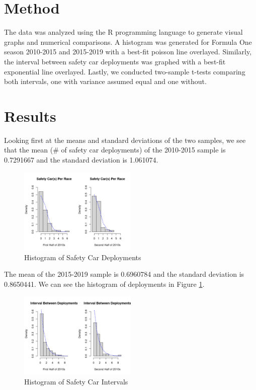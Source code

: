 \documentclass[11pt]{article}
\begin{document}
\section{Method}
The data was analyzed using the R programming language to generate visual graphs and numerical comparisons. A histogram was generated for Formula One season 2010-2015 and 2015-2019 with a best-fit poisson line overlayed.
Similarly, the interval between safety car deployments was graphed with a best-fit exponential line overlayed.
Lastly, we conducted two-sample t-tests comparing both intervals, one with variance assumed equal and one without.

\pagebreak

\section{Results}

Looking first at the means and standard deviations of the two samples, we see that the mean (\# of safety car deployments) of the 2010-2015 sample is 0.7291667 and the standard deviation is 1.061074.

\begin{figure}[h]
    \centering
    \includegraphics[width=0.5\textwidth]{deployment-histogram.png}
    \caption{Histogram of Safety Car Deployments}
    \label{fig:histogram}
\end{figure}

The mean of the 2015-2019 sample is 0.6960784 and the standard deviation is 0.8650441.
We can see the histogram of deployments in Figure \ref{fig:histogram}.

\begin{figure}[h]
    \centering
    \includegraphics[width=0.5\textwidth]{interval-histogram.png}
    \caption{Histogram of Safety Car Intervals}
    \label{fig:interval}
\end{figure}
\end{document}

